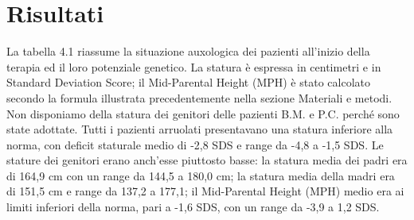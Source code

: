 \chapter{Risultati}

La tabella 4.1 riassume la situazione auxologica dei pazienti all'inizio della terapia ed il loro potenziale genetico. La statura è espressa in centimetri e in Standard Deviation Score; il Mid-Parental Height (MPH) è stato calcolato secondo la formula illustrata precedentemente nella sezione Materiali e metodi. Non disponiamo della statura dei genitori delle pazienti B.M. e P.C. perché sono state adottate. Tutti i pazienti arruolati presentavano una statura inferiore alla norma, con deficit staturale medio di -2,8 SDS e range da -4,8 a -1,5 SDS. Le stature dei genitori erano anch'esse piuttosto basse: la statura media dei padri era di 164,9 cm con un range da 144,5 a 180,0 cm; la statura media della madri era di 151,5 cm e range da 137,2 a 177,1; il Mid-Parental Height (MPH) medio era ai limiti inferiori della norma, pari a -1,6 SDS, con un range da -3,9 a 1,2 SDS.

